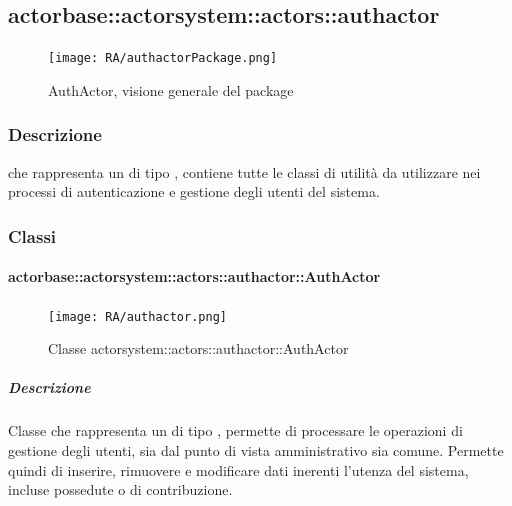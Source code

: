 \documentclass{scalatekids-article}
\begin{document}

\subsection{actorbase::actorsystem::actors::authactor}
\label{sec:actorbase::actorsystem::actors::authactor}

\begin{figure}[H]
  \begin{center}
    \texttt{[image: RA/authactorPackage.png]}
    \caption{AuthActor, visione generale del package}
  \end{center}
\end{figure}

\subsubsection{Descrizione}
 che rappresenta un  di tipo ,
contiene tutte le classi di utilità da utilizzare nei processi di autenticazione
e gestione degli utenti del sistema.

\subsubsection{Classi}
\paragraph{actorbase::actorsystem::actors::authactor::AuthActor}
\label{sec:actorbase::actorsystem::actors::authactor::AuthActor}

\begin{figure}[H]
  \begin{center}
    \texttt{[image: RA/authactor.png]}
    \caption{Classe actorsystem::actors::authactor::AuthActor}
  \end{center}
\end{figure}

\subparagraph{Descrizione}
Classe che rappresenta un  di tipo , permette di processare
le operazioni di gestione degli utenti, sia dal punto di vista amministrativo sia comune.
Permette quindi di inserire, rimuovere e modificare dati inerenti l'utenza del sistema, incluse
 possedute o di contribuzione.
\end{document}
